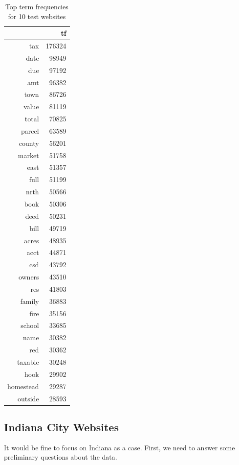 \documentclass[11pt]{article}
\begin{document}
\begin{table}[ht]
	\centering
	\begin{tabular}{rr}
		\hline
		& tf \\ 
		\hline
		tax & 176324 \\ 
		date & 98949 \\ 
		due & 97192 \\ 
		amt & 96382 \\ 
		town & 86726 \\ 
		value & 81119 \\ 
		total & 70825 \\ 
		parcel & 63589 \\ 
		county & 56201 \\ 
		market & 51758 \\ 
		east & 51357 \\ 
		full & 51199 \\ 
		nrth & 50566 \\ 
		book & 50306 \\ 
		deed & 50231 \\ 
		bill & 49719 \\ 
		acres & 48935 \\ 
		acct & 44871 \\ 
		csd & 43792 \\ 
		owners & 43510 \\ 
		res & 41803 \\ 
		family & 36883 \\ 
		fire & 35156 \\ 
		school & 33685 \\ 
		name & 30382 \\ 
		red & 30362 \\ 
		taxable & 30248 \\ 
		hook & 29902 \\ 
		homestead & 29287 \\ 
		outside & 28593 \\ 
		\hline
	\end{tabular}
	\caption{Top term frequencies for 10 test websites} 
\end{table}

\subsection{Indiana City Websites}

It would be fine to focus on Indiana as a case. First, we need to answer some preliminary questions about the data.
\end{document}
